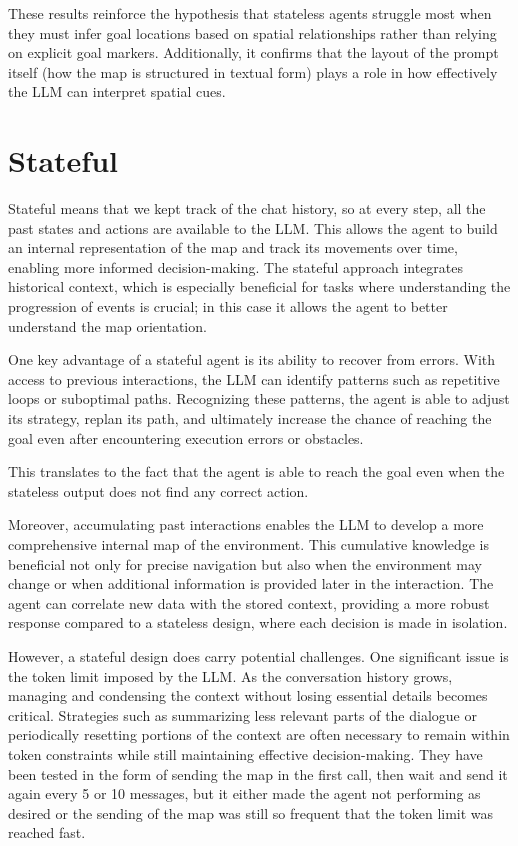 These results reinforce the hypothesis that stateless agents struggle most when
they must infer goal locations based on spatial relationships rather than
relying on explicit goal markers. Additionally, it confirms that the layout of
the prompt itself (how the map is structured in textual form) plays a role in
how effectively the LLM can interpret spatial cues.

\section{Stateful}
\label{sec:stateful}

Stateful means that we kept track of the chat history, so at every step, all the
past states and actions are available to the LLM. This allows the agent to build
an internal representation of the map and track its movements over time, enabling
more informed decision-making. The stateful approach integrates historical
context, which is especially beneficial for tasks where understanding the progression
of events is crucial; in this case it allows the agent to better understand the
map orientation.

One key advantage of a stateful agent is its ability to recover from errors. With
access to previous interactions, the LLM can identify patterns such as
repetitive loops or suboptimal paths. Recognizing these patterns, the agent is
able to adjust its strategy, replan its path, and ultimately increase the chance
of reaching the goal even after encountering execution errors or obstacles.

This translates to the fact that the agent is able to reach the goal even when
the stateless output does not find any correct action.

Moreover, accumulating past interactions enables the LLM to develop a more comprehensive
internal map of the environment. This cumulative knowledge is beneficial not
only for precise navigation but also when the environment may change or when
additional information is provided later in the interaction. The agent can correlate
new data with the stored context, providing a more robust response compared to a
stateless design, where each decision is made in isolation.

However, a stateful design does carry potential challenges. One significant issue
is the token limit imposed by the LLM. As the conversation history grows, managing
and condensing the context without losing essential details becomes critical.
Strategies such as summarizing less relevant parts of the dialogue or
periodically resetting portions of the context are often necessary to remain
within token constraints while still maintaining effective decision-making. They
have been tested in the form of sending the map in the first call, then wait and
send it again every 5 or 10 messages, but it either made the agent not performing
as desired or the sending of the map was still so frequent that the token limit was
reached fast.

